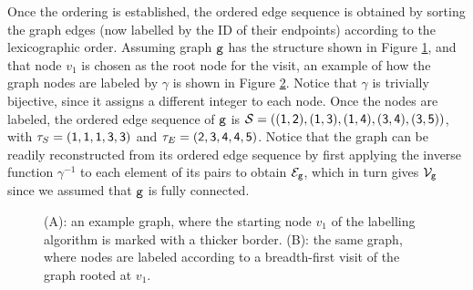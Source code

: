 Once the ordering is established, the ordered edge sequence is obtained by sorting the graph edges (now labelled by the ID of their endpoints) according to the lexicographic order. Assuming graph $\mathtt{g}$ has the structure shown in Figure \ref{fig:example-graph}, and that node $v_1$ is chosen as the root node for the visit, an example of how the graph nodes are labeled by $\gamma$ is shown in Figure \ref{fig:labeled-graph}. Notice that $\gamma$ is trivially bijective, since it assigns a different integer to each node. Once the nodes are labeled, the ordered edge sequence of $\mathtt{g}$ is $\OES{S} = (\OElem{1}{2},\OElem{1}{3},\OElem{1}{4},\OElem{3}{4},\OElem{3}{5})$, with $\tau_S = (\mathsf{1},\mathsf{1},\mathsf{1},\mathsf{3},\mathsf{3})$ and $\tau_E = (\mathsf{2},\mathsf{3},\mathsf{4},\mathsf{4},\mathsf{5})$. Notice that the graph can be readily reconstructed from its ordered edge sequence by first applying the inverse function $\gamma^{-1}$ to each element of its pairs to obtain $\Edges{g}$, which in turn gives $\Nodes{g}$ since we assumed that $\mathtt{g}$ is fully connected.

\begin{figure}[h!]
    \begin{subfigure}[b]{0.48\linewidth}
        \centering
        \resizebox{.8\textwidth}{!}{}
        \caption{}
        \label{fig:example-graph}
    \end{subfigure}
    \begin{subfigure}[b]{0.48\linewidth}
        \centering
        \resizebox{.8\textwidth}{!}{}
        \caption{}
        \label{fig:labeled-graph}
    \end{subfigure}
    \caption{({\scriptsize A}): an example graph, where the starting node $v_1$ of the labelling algorithm is marked with a thicker border. ({\scriptsize B}): the same graph, where nodes are labeled according to a breadth-first visit of the graph rooted at $v_1$.}
    \label{fig:labelling-example}
\end{figure}

